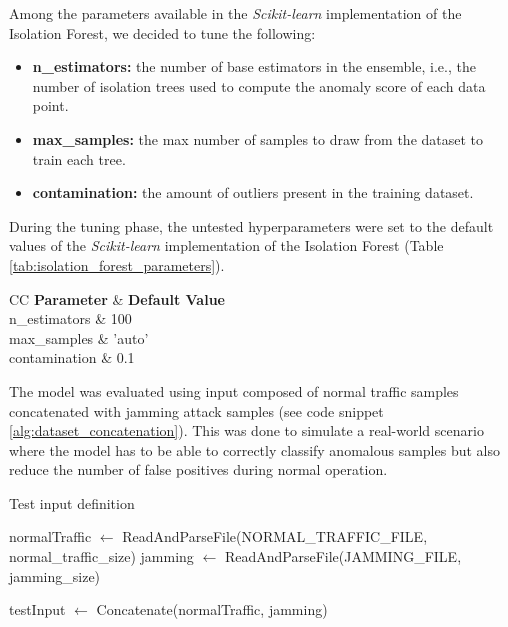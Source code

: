 \documentclass[futureinternet,article,submit,pdftex,moreauthors]{Definitions/mdpi}
\begin{document}
Among the parameters available in the \textit{Scikit-learn} implementation of the Isolation Forest, we decided to tune the following: 

\begin{itemize}
	\item \textbf{n\_estimators:} the number of base estimators in the ensemble, i.e., the number of isolation trees used to compute the anomaly score of each data point. 
	\item \textbf{max\_samples:} the max number of samples to draw from the dataset to train each tree.
	\item \textbf{contamination:} the amount of outliers present in the training dataset.  
\end{itemize} 
During the tuning phase, the untested hyperparameters were set to the default values of the \textit{Scikit-learn} implementation of the Isolation Forest (Table \ref{tab:isolation_forest_parameters}).

\begin{table}[H]
	\caption{Scikit-Learn Isolation Forest hyperparameters default values.\label{tab:isolation_forest_parameters}}
	\begin{tabularx}{\textwidth}{CC}
	\toprule
	\textbf{Parameter} & \textbf{Default Value} \\
	\midrule
	n\_estimators & 100 \\
	max\_samples & 'auto' \\
	contamination & 0.1 \\
	\bottomrule
	\end{tabularx}
\end{table}

The model was evaluated using input composed of normal traffic samples concatenated with jamming attack samples (see code snippet \ref{alg:dataset_concatenation}). 
This was done to simulate a real-world scenario where the model has to be able to correctly classify anomalous samples but also reduce the number of false positives during normal operation. 

\begin{algorithm}
	\caption{Test input definition}\label{alg:dataset_concatenation}
	\begin{algorithmic}[1]
	\State normalTraffic $\gets$ ReadAndParseFile(NORMAL\_TRAFFIC\_FILE, normal\_traffic\_size)
	\State jamming $\gets$ ReadAndParseFile(JAMMING\_FILE, jamming\_size)

	\State testInput $\gets$ Concatenate(normalTraffic, jamming)
	\end{algorithmic}
\end{algorithm}
\end{document}
